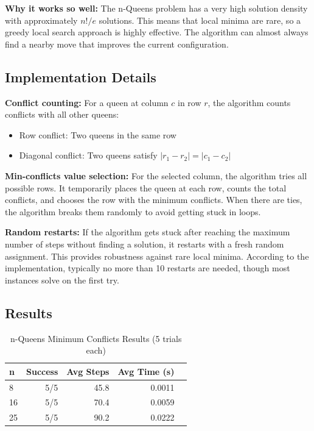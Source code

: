 \documentclass[letterpaper]{article}
\begin{document}
\textbf{Why it works so well:} The n-Queens problem has a very high solution density with approximately $n!/e$ solutions. This means that local minima are rare, so a greedy local search approach is highly effective. The algorithm can almost always find a nearby move that improves the current configuration.

\subsection{Implementation Details}

\textbf{Conflict counting:} For a queen at column $c$ in row $r$, the algorithm counts conflicts with all other queens:
\begin{itemize}
\item Row conflict: Two queens in the same row
\item Diagonal conflict: Two queens satisfy $|r_1 - r_2| = |c_1 - c_2|$
\end{itemize}

\textbf{Min-conflicts value selection:} For the selected column, the algorithm tries all possible rows. It temporarily places the queen at each row, counts the total conflicts, and chooses the row with the minimum conflicts. When there are ties, the algorithm breaks them randomly to avoid getting stuck in loops.

\textbf{Random restarts:} If the algorithm gets stuck after reaching the maximum number of steps without finding a solution, it restarts with a fresh random assignment. This provides robustness against rare local minima. According to the implementation, typically no more than 10 restarts are needed, though most instances solve on the first try.

\subsection{Results}

\begin{table}[h]
\centering
\caption{n-Queens Minimum Conflicts Results (5 trials each)}
\label{tab:nqueens-results}
\begin{tabular}{@{}lrrrr@{}}
\toprule
\textbf{n} & \textbf{Success} & \textbf{Avg Steps} & \textbf{Avg Time (s)} \\
\midrule
8  & 5/5 & 45.8 & 0.0011 \\
16 & 5/5 & 70.4 & 0.0059 \\
25 & 5/5 & 90.2 & 0.0222 \\
\bottomrule
\end{tabular}
\end{table}
\end{document}
